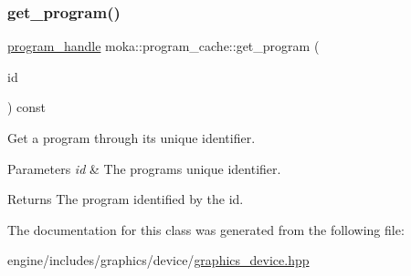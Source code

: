 \subsubsection{\texorpdfstring{get\_program()}{get\_program()}}
{\footnotesize\ttfamily \mbox{\hyperlink{structmoka_1_1program__handle}{program\+\_\+handle}} moka\+::program\+\_\+cache\+::get\+\_\+program (\begin{DoxyParamCaption}\item[{const \mbox{\hyperlink{namespacemoka_a2384dba7b6a57a9ae52567eefd6e177e}{program\+\_\+id}} \&}]{id }\end{DoxyParamCaption}) const}



Get a program through its unique identifier. 


\begin{DoxyParams}{Parameters}
{\em id} & The program\textquotesingle{}s unique identifier. \\
\hline
\end{DoxyParams}
\begin{DoxyReturn}{Returns}
The program identified by the id. 
\end{DoxyReturn}


The documentation for this class was generated from the following file\+:\begin{DoxyCompactItemize}
\item 
engine/includes/graphics/device/\mbox{\hyperlink{graphics__device_8hpp}{graphics\+\_\+device.\+hpp}}\end{DoxyCompactItemize}
